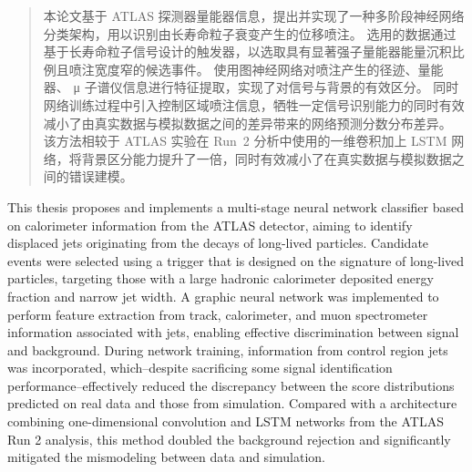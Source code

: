 

\begin{abstract}
  本论文基于 ATLAS 探测器量能器信息，提出并实现了一种多阶段神经网络分类架构，用以识别由长寿命粒子衰变产生的位移喷注。
  选用的数据通过基于长寿命粒子信号设计的触发器，以选取具有显著强子量能器能量沉积比例且喷注宽度窄的候选事件。
  使用图神经网络对喷注产生的径迹、量能器、 μ 子谱仪信息进行特征提取，实现了对信号与背景的有效区分。
  同时网络训练过程中引入控制区域喷注信息，牺牲一定信号识别能力的同时有效减小了由真实数据与模拟数据之间的差异带来的网络预测分数分布差异。
  该方法相较于 ATLAS 实验在 Run~2 分析中使用的一维卷积加上 LSTM 网络，将背景区分能力提升了一倍，同时有效减小了在真实数据与模拟数据之间的错误建模。
\end{abstract}

\begin{abstract*}
  This thesis proposes and implements a multi-stage neural network classifier based on calorimeter information from the ATLAS detector,
  aiming to identify displaced jets originating from the decays of long-lived particles.
  Candidate events were selected using a trigger that is designed on the signature of long-lived particles,
  targeting those with a large hadronic calorimeter deposited energy fraction and narrow jet width.
  A graphic neural network was implemented to perform feature extraction from track, calorimeter,
  and muon spectrometer information associated with jets, enabling effective discrimination between signal and background.
  During network training, information from control region jets was incorporated,
  which--despite sacrificing some signal identification performance--effectively reduced the discrepancy
  between the score distributions predicted on real data and those from simulation.
  Compared with a architecture combining one-dimensional convolution and LSTM networks from the ATLAS Run 2 analysis,
  this method doubled the background rejection and significantly mitigated the mismodeling between data and simulation.
\end{abstract*}
